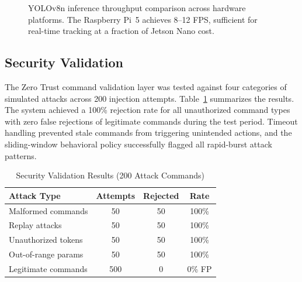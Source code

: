\documentclass[conference]{IEEEtran}
\begin{document}
\begin{figure}[!t]
\centering
{}
\caption{YOLOv8n inference throughput comparison across hardware platforms. The Raspberry Pi~5 achieves 8--12 FPS, sufficient for real-time tracking at a fraction of Jetson Nano cost.}
\label{fig:fps_comparison}
\end{figure}

\subsection{Security Validation}

The Zero Trust command validation layer was tested against four categories of simulated attacks across 200 injection attempts. Table~\ref{tab:security} summarizes the results. The system achieved a 100\% rejection rate for all unauthorized command types with zero false rejections of legitimate commands during the test period. Timeout handling prevented stale commands from triggering unintended actions, and the sliding-window behavioral policy successfully flagged all rapid-burst attack patterns.

\begin{table}[!t]
\centering
\caption{Security Validation Results (200 Attack Commands)}
\label{tab:security}
\begin{tabular}{lccc}
\toprule
\textbf{Attack Type} & \textbf{Attempts} & \textbf{Rejected} & \textbf{Rate} \\
\midrule
Malformed commands     & 50  & 50  & 100\% \\
Replay attacks         & 50  & 50  & 100\% \\
Unauthorized tokens    & 50  & 50  & 100\% \\
Out-of-range params    & 50  & 50  & 100\% \\
\midrule
Legitimate commands    & 500 & 0   & 0\% FP \\
\bottomrule
\end{tabular}
\end{table}
\end{document}

